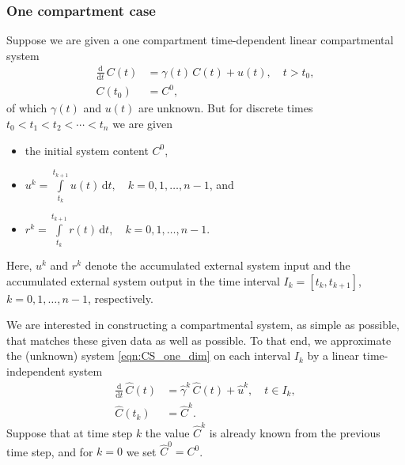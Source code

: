 \documentclass[11pt,a4paper]{article}
\newcommand{\deriv}[1]{\frac{\mathrm{d}}{\mathrm{d}#1}}
\newcommand{\dd}[1]{\,\mathrm{d}#1}
\newcommand{\intl}{\int\limits}
\begin{document}
    \subsubsection*{One compartment case}
        Suppose we are given a one compartment time-dependent linear compartmental system
        \begin{equation}\label{eqn:CS_one_dim}
            \begin{aligned}
                \deriv{t}\,C(t) &= \gamma(t)\,C(t) + u(t),\quad t>t_0,\\
                C(t_0) &= C^0,
            \end{aligned}
        \end{equation}
        of which $\gamma(t)$ and $u(t)$ are unknown.
        But for discrete times $t_0<t_1<t_2<\cdots<t_n$ we are given
        \begin{itemize}
            \item the initial system content $C^0$,
            \item $u^k = \intl_{t_k}^{t_{k+1}} u(t)\dd{t},\quad k=0,1,\ldots,n-1$, and
            \item $r^k = \intl_{t_k}^{t_{k+1}} r(t)\dd{t},\quad k=0,1,\ldots,n-1$.
        \end{itemize}
        Here, $u^k$ and $r^k$ denote the accumulated external system input and the accumulated external system output in the time interval $I_k=[t_k,t_{k+1}]$, $k=0,1,\ldots,n-1$, respectively.

        We are interested in constructing a compartmental system, as simple as possible, that matches these given data as well as possible.
        To that end, we approximate the (unknown) system \eqref{eqn:CS_one_dim} on each interval $I_k$ by a linear time-independent system
        \begin{equation}\label{eqn:CS_one_dim_approx}
            \begin{aligned}
                \deriv{t}\,\widehat{C}(t) &= \widehat{\gamma}^k\,\widehat{C}(t) + \widehat{u}^k,\quad t\in I_k,\\
                \widehat{C}(t_k) &= \widehat{C}^k.
            \end{aligned}
        \end{equation}
        Suppose that at time step $k$ the value $\widehat{C}^k$ is already known from the previous time step,
        and for $k=0$ we set $\widehat{C}^0=C^0$.
        
\end{document}
